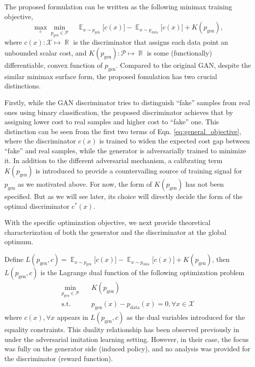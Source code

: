 \documentclass[a4paper]{article}
\newcommand{\pd}{p_\text{data}}
\newcommand{\pg}{p_\text{gen}}
\DeclareMathOperator*{\E}{\mathbb{E}}
\DeclareMathOperator{\R}{\mathbb{R}}
\begin{document}
The proposed formulation can be written as the following minimax training objective, 
\begin{equation}
\label{eq:general_objective}
\max_{c} \min_{\pg \in \mathcal{P}} \quad
	\E_{x \sim \pg} \big[ c(x) \big] - 
    \E_{x \sim \pd} \big[ c(x) \big] + K(\pg),
\end{equation}
where $c(x): \mathcal{X} \mapsto \R$ is the discriminator that assigns each data point an unbounded scalar cost, and $K(\pg): \mathcal{P} \mapsto \R$ is some (functionally) differentiable, convex function of $\pg$.
Compared to the original GAN, despite the similar minimax surface form, the proposed fomulation has two crucial distinctions. 

Firstly, while the GAN discriminator tries to distinguish ``fake'' samples from real ones using binary classification, the proposed discriminator achieves that by assigning lower cost to real samples and higher cost to ``fake'' one.
This distinction can be seen from the first two terms of Eqn. \eqref{eq:general_objective}, where the discriminator $c(x)$ is trained to widen the expected cost gap between ``fake'' and real samples, while
the generator is adversarially trained to minimize it. In addition to the different adversarial mechanism, a calibrating term $K(\pg)$ is introduced to provide a countervailing source of training signal for $\pg$ as we motivated above.
For now, the form of $K(\pg)$ has not been specified. But as we will see later, its choice will directly decide the form of the optimal discriminator $c^*(x)$.





With the specific optimization objective, we next provide theoretical characterization of both the generator and the discriminator at the global optimum. 

Define $L(\pg, c) = \E_{x \sim \pg} \big[ c(x) \big] - \E_{x \sim \pd} \big[ c(x) \big] + K(\pg)$, then $L(\pg, c)$ is the Lagrange dual function of the following optimization problem
\begin{equation}
\label{eq:constrained_primal_problem}
\begin{aligned}
	\min_{\pg \in \mathcal{P}}&\quad  K(\pg) \\
	\text{s.t.}&\quad \pg(x) - \pd(x) = 0, \forall x \in \mathcal{X}
\end{aligned}
\end{equation}
where $c(x), \forall x$ appears in $L(\pg, c)$ as the dual variables introduced for the equality constraints.
This duality relationship has been observed previously in \citep[equation (7)]{ho2016generative} under the adversarial imitation learning setting.
However, in their case, the focus was fully on the generator side (induced policy), and no analysis was provided for the discriminator (reward function).
\end{document}
